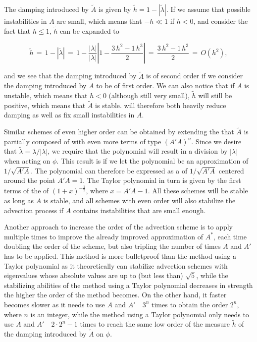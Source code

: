The damping introduced by $\tilde{A}$ is given by $\tilde{h} = 1 - |\tilde{\lambda}|$. If we assume that possible instabilities in $A$ are small, which means that $-h \ll 1$ if $h < 0$, and consider the fact that $h \leq 1$, $\tilde{h}$ can be expanded to

\begin{equation}
\tilde{h} \,=\, 1 - |\tilde{\lambda}| \,=\, 1 - \frac{|\lambda|}{|\lambda|}\left|1 - \displaystyle\frac{3\,h^2 - 1\,h^3}{2}\right| \,=\, \displaystyle\frac{3\,h^2 - 1\,h^3}{2} \,=\, O(h^2),
\end{equation}

and we see that the damping introduced by $\tilde{A}$ is of second order if we consider the damping introduced by $A$ to be of first order. We can also notice that if $A$ is unstable, which means that $h < 0$ (although still very small), $\tilde{h}$ will still be positive, which means that $\tilde{A}$ is stable. \BFECC will therefore both heavily reduce damping as well as fix small instabilities in $A$.

Similar schemes of even higher order can be obtained by extending the \polynomial that $\tilde{A}$ is partially composed of with even more terms of type $(A'A)^n$. Since we desire that $\tilde{\lambda} = \lambda/|\lambda|$, we require that the polynomial will result in a division by $|\lambda|$ when acting on $\phi$. This result is \approximated if we let the polynomial be an approximation of $1/\sqrt{A'A}$. The polynomial can therefore be expressed as a  of $1/\sqrt{A'A}$ centered around the point $A'A = 1$. The Taylor polynomial in turn is given by the first terms of the  of $(1+x)^{-\frac{1}{2}}$, where $x = A'A - 1$. All these schemes will be stable as long as $A$ is stable, and all schemes with even order will also stabilize the advection process if $A$ contains instabilities that are small enough.

Another approach to increase the order of the advection scheme is to apply \BFECC multiple times to improve the already improved approximation of $A^*$, each time doubling the order of the scheme, but also tripling the number of times $A$ and $A'$ has to be applied. This method is more bulletproof than the method using a Taylor polynomial as it theoretically can stabilize advection schemes with eigenvalues whose absolute values are up to (but less than) $\sqrt{5}$, while the stabilizing abilities of the method using a Taylor polynomial decreases in strength the higher the order of the method becomes. On the other hand, it faster becomes slower as it needs to use $A$ and $A'$\ \ $3^n$ times to obtain the order $2^n$, where $n$ is an integer, while the method using a Taylor polynomial only needs to use $A$ and $A'$\ \ $2\cdot 2^n - 1$ times to reach the same low order of the measure $\tilde{h}$ of the damping introduced by $\tilde{A}$ on $\phi$.

